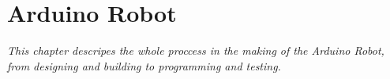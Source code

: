 \chapter{Arduino Robot}
\textit{This chapter descripes the whole proccess in the making of the Arduino Robot, from designing and building to programming and testing.}%



